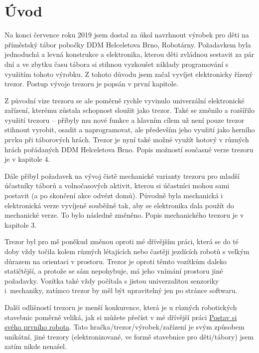 \chapter*{Úvod}

Na konci července roku 2019 jsem dostal za úkol navrhnout výrobek pro děti na příměstský tábor pobočky DDM Helceletova Brno, Robotárny. %
 Poža\-dav\-kem 
byla jednoduchá a levná konstrukce a elektronika, kterou děti zvládnou sestavit za pár dní a ve zbytku času tábora si stihnou vyzkoušet základy programování 
s využitím tohoto výrobku. Z tohoto důvodu jsem začal vyvíjet elektronicky řízený trezor. Postup vývoje trezoru je popsán v první kapitole. %

Z původní vize trezoru se ale poměrně rychle vyvinulo
univerzální elektronické zařízení, kterému zůstala schopnost sloužit jako trezor.
Také se změnilo a rozšířilo využití trezoru -- přibyly mu nové funkce a hlavním cílem už není pouze trezor stihnout vyrobit, osadit a naprogramovat, ale především jeho využití jako herního prvku při táborových hrách. 
Trezor je nyní také možné využít hotový v různých hrách pořádaných DDM Helceletova Brno.
Popis možností současné verze trezoru je v kapitole 4.

Dále přibyl požadavek na vývoj čistě mechanické varianty trezoru pro mladší účastníky táborů a volnočasových aktivit, kterou si účastníci mohou sami postavit (a po skončení akce odvézt domů). 
Původně byla mechanická i elektronická verze vyvíjené souběžně tak, aby se elektronika dala použít do mechanické verze. To bylo následně změněno. 
Popis mechanického trezoru je v kapitole 3. 

Trezor byl pro mě poněkud změnou oproti mé dřívějším práci, která se do té doby vždy točila kolem různých létajících nebo častěji jezdících robotů s velkým důrazem na orientaci v prostoru.
Trezor je oproti těmto vozítkům daleko statičtější, a protože se sám nepohybuje, má jeho vnímání prostoru jiné požadavky. Vozítka také vždy počítala s jistou univerzalitou senzoriky i~mechaniky,
zatímco trezor by měl být upravitelný jen po stránce softwaru. 

Další odlišností trezoru je menší konkurence, která je u různých robotických stavebnic poměrně veliká, jak si můžete přečíst 
v mé dřívější práci \href{https://github.com/TVavrinec/SOC-text/blob/master/SOČ.pdf}{Postav si svého prvního robota}.
Tato hračka/trezor/výrobek/zařízení je svým způsobem unikátní, jiné trezory (elektronizované, ve formě stavebnice pro děti/tábory) jsem zatím nikde nenašel. 


